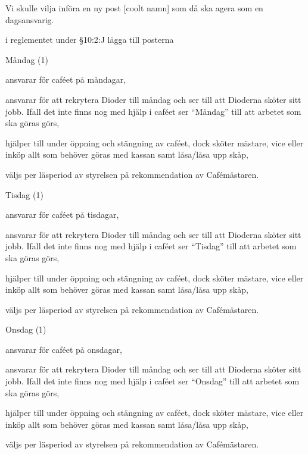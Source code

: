 \documentclass[../_main/handlingar.tex]{subfiles}
\begin{document}
Vi skulle vilja införa en ny post [coolt namn] som då ska agera som en dagsansvarig.
\begin{attsatser}
    \att i reglementet under \S10:2:J lägga till posterna\par
        Måndag (1)
        \begin{tightdashlist}
            \item ansvarar för caféet på måndagar,
            \item ansvarar för att rekrytera Dioder till måndag och ser till att Dioderna sköter sitt jobb. Ifall det inte finns nog med hjälp i caféet ser “Måndag”  till att arbetet som ska göras görs,
            \item hjälper till under öppning och stängning av caféet, dock sköter mästare, vice eller inköp allt som behöver göras med kassan samt låsa/låsa upp skåp,
            \item väljs per läsperiod av styrelsen på rekommendation av Cafémästaren.
        \end{tightdashlist}
        Tisdag (1)
          \begin{tightdashlist}
            \item ansvarar för caféet på tisdagar,
            \item ansvarar för att rekrytera Dioder till måndag och ser till att Dioderna sköter sitt jobb. Ifall det inte finns nog med hjälp i caféet ser ``Tisdag''  till att arbetet som ska göras görs,
            \item hjälper till under öppning och stängning av caféet, dock sköter mästare, vice eller inköp allt som behöver göras med kassan samt låsa/låsa upp skåp,
            \item väljs per läsperiod av styrelsen på rekommendation av Cafémästaren.
          \end{tightdashlist}
          Onsdag (1)
            \begin{tightdashlist}
              \item ansvarar för caféet på onsdagar,
              \item ansvarar för att rekrytera Dioder till måndag och ser till att Dioderna sköter sitt jobb. Ifall det inte finns nog med hjälp i caféet ser ``Onsdag''  till att arbetet som ska göras görs,
              \item hjälper till under öppning och stängning av caféet, dock sköter mästare, vice eller inköp allt som behöver göras med kassan samt låsa/låsa upp skåp,
              \item väljs per läsperiod av styrelsen på rekommendation av Cafémästaren.

\end{tightdashlist}
\end{attsatser}
\end{document}
